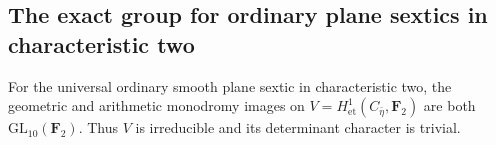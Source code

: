 \subsection{The exact group for ordinary plane sextics in characteristic two}
\label{subsec:sextic-exact}

\begin{theorem}\label{thm:sextic-full-monodromy}
For the universal ordinary smooth plane sextic in characteristic two,
the geometric and arithmetic monodromy images on
$V=H^1_{\mathrm{et}}(C_{\bar\eta},\mathbf F_2)$ are both
$\mathrm{GL}_{10}(\mathbf F_2)$.  Thus $V$ is irreducible and its
determinant character is trivial.
\end{theorem}

